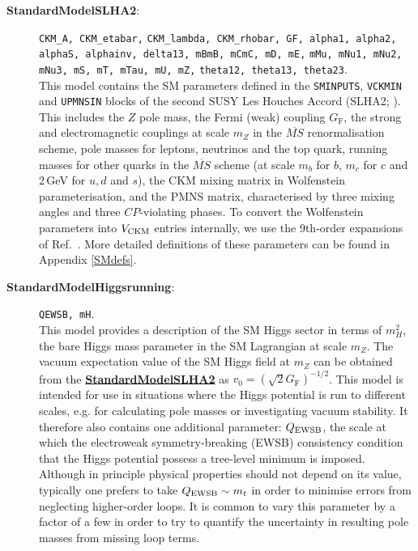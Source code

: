 \documentclass[pdftex,twocolumn,epjc3_preprint,runningheads]{svjour3}
\renewcommand{\_}{\discretionary{\underscore}{}{\underscore}}
\newcommand\term[1]{{\lstset{style=terminal}\lstinline!#1!\lstset{style=cpp}}}
\newcommand{\doublecrosssf}[2]{\hyperref[#2]{\textbf{\textsf{#1}}}}
\newcommand{\MSbar}{$\MSBar$\xspace}
\newcommand{\MSBar}{\overline{MS}}
\begin{document}
\begin{description}

\item[\textbf{\textsf{StandardModel\_SLHA2}}\label{SM_SLHA2}:] \term{CKM_A, CKM_etabar,} \term{CKM_lambda, CKM_rhobar, GF, alpha1, alpha2,} \term{alphaS, alphainv, delta13, mBmB, mCmC, mD, mE,} \term{mMu, mNu1, mNu2, mNu3, mS, mT, mTau, mU, mZ,} \term{theta12, theta13, theta23}.\\
This model contains the SM parameters defined in the \texttt{SMINPUTS}, \texttt{VCKMIN} and \texttt{UPMNSIN} blocks of the second SUSY Les Houches Accord (SLHA2; \cite{Allanach:2008qq}).  This includes the $Z$ pole mass, the Fermi (weak) coupling $G_\mathrm{F}$, the strong and electromagnetic couplings at scale $m_Z$ in the \MSbar renormalisation scheme, pole masses for leptons, neutrinos and the top quark, running masses for other quarks in the \MSbar scheme (at scale $m_b$ for $b$, $m_c$ for $c$ and 2\,GeV for $u, d$ and $s$), the CKM mixing matrix in Wolfenstein parameterisation, and the PMNS matrix, characterised by three mixing angles and three $CP$-violating phases.  To convert the Wolfenstein parameters into $V_{\rm CKM}$ entries internally, we use the 9th-order expansions of Ref.\ \cite{CKMFitter}.  More detailed definitions of these parameters can be found in Appendix \ref{SMdefs}. \vspace{2mm}

\item[\textbf{\textsf{StandardModel\_Higgs\_running}}\label{SM_h_run}:] \term{QEWSB, mH}.\\
This model provides a description of the SM Higgs sector in terms of $m^2_H$, the bare Higgs mass parameter in the SM Lagrangian at scale $m_Z$.  The vacuum expectation value of the SM Higgs field at $m_Z$ can be obtained from the \doublecrosssf{StandardModel\_SLHA2}{SM_SLHA2} as $v_0 = (\sqrt{2}G_\mathrm{F})^{-1/2}$.  This model is intended for use in situations where the Higgs potential is run to different scales, e.g. for calculating pole masses or investigating vacuum stability.  It therefore also contains one additional parameter: $Q_{\rm EWSB}$, the scale at which the electroweak symmetry-breaking (EWSB) consistency condition that the Higgs potential possess a tree-level minimum is imposed.  Although in principle physical properties should not depend on its value, typically one prefers to take $Q_{\rm EWSB}\sim m_t$ in order to minimise errors from neglecting higher-order loops.  It is common to vary this parameter by a factor of a few in order to try to quantify the uncertainty in resulting pole masses from missing loop terms. \vspace{2mm}


\end{description}
\end{document}
